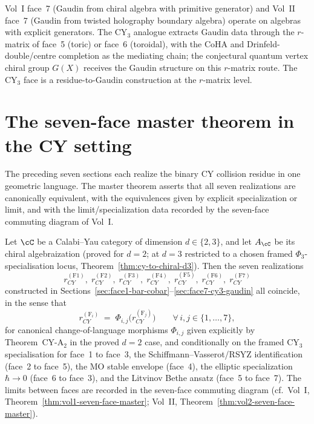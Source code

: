 \begin{remark}
\label{rem:face7-cy3-specific}
Vol~I face~7 (Gaudin from chiral algebra with primitive generator) and
Vol~II face~7 (Gaudin from twisted holography boundary algebra) operate
on algebras with explicit generators. The CY$_3$ analogue extracts
Gaudin data through the $r$-matrix of face~5 (toric) or face~6
(toroidal), with the CoHA and Drinfeld-double/centre completion as the
mediating chain; the conjectural quantum vertex chiral group $G(X)$
receives the Gaudin structure on this $r$-matrix route. The CY$_3$
face is a residue-to-Gaudin construction at the $r$-matrix level.
\end{remark}


\section{The seven-face master theorem in the CY setting}
\label{sec:cy-seven-face-master}

The preceding seven sections each realize the binary CY collision residue
in one geometric language. The master theorem asserts that all seven
realizations are canonically equivalent, with the equivalences given by
explicit specialization or limit, and with the limit/specialization data
recorded by the seven-face commuting diagram of Vol~I.

\begin{conjecture}
\label{conj:cy-seven-face-master}
\ClaimStatusConjectured
Let $\cC$ be a Calabi--Yau category of dimension $d \in \{2, 3\}$, and
let $A_\cC$ be its chiral algebraization (proved for $d = 2$; at
$d = 3$ restricted to a chosen framed $\Phi_3$-specialisation locus,
Theorem~\ref{thm:cy-to-chiral-d3}). Then the seven realizations
\[
 r_{CY}^{(\mathrm{F1})},\;
 r_{CY}^{(\mathrm{F2})},\;
 r_{CY}^{(\mathrm{F3})},\;
 r_{CY}^{(\mathrm{F4})},\;
 r_{CY}^{(\mathrm{F5})},\;
 r_{CY}^{(\mathrm{F6})},\;
 r_{CY}^{(\mathrm{F7})}
\]
constructed in
Sections~\ref{sec:face1-bar-cobar}--\ref{sec:face7-cy3-gaudin}
all coincide, in the sense that
\[
 r_{CY}^{(\mathrm{F}_i)} \;=\;
 \Phi_{i,j}\bigl(r_{CY}^{(\mathrm{F}_j)}\bigr)
 \qquad \forall\, i, j \in \{1, \ldots, 7\},
\]
for canonical change-of-language morphisms $\Phi_{i,j}$ given explicitly
by Theorem~CY-A$_2$ in the proved $d = 2$ case, and conditionally on the
framed CY$_3$ specialisation for face~1 to face~3, the
Schiffmann--Vasserot/RSYZ identification (face~2 to face~5), the MO
stable envelope (face~4), the elliptic specialization $\hbar \to 0$
(face~6 to face~3), and the Litvinov Bethe ansatz (face~5 to face~7).
The limits between faces are recorded in the seven-face commuting
diagram (cf.\ Vol~I,
Theorem~\ref{thm:vol1-seven-face-master}; Vol~II,
Theorem~\ref{thm:vol2-seven-face-master}).
\end{conjecture}

